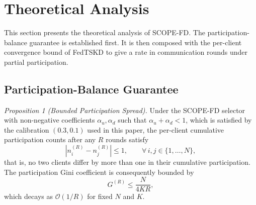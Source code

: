\documentclass[journal]{IEEEtran}
\newcommand{\rev}[1]{#1}
\begin{document}
\section{Theoretical Analysis}
\label{sec:theory}

This section presents the theoretical analysis of SCOPE-FD. The participation-balance guarantee is established first. \rev{It is then composed with the per-client convergence bound of FedTSKD \cite{mu2024fedtskd} to give a rate in communication rounds under partial participation.}

\subsection{Participation-Balance Guarantee}
\label{ssec:participation-balance}

\textit{Proposition 1 (Bounded Participation Spread).} Under the SCOPE-FD selector with non-negative coefficients $\alpha_u, \alpha_d$ such that $\alpha_u + \alpha_d < 1$, which is satisfied by the calibration $(0.3, 0.1)$ used in this paper, the per-client cumulative participation counts after any $R$ rounds satisfy
\begin{equation}
\left| n_i^{(R)} - n_j^{(R)} \right| \le 1, \qquad \forall\, i,j \in \{1,\dots,N\},
\label{eq:spread}
\end{equation}
that is, no two clients differ by more than one in their cumulative participation. The participation Gini coefficient is consequently bounded by
\begin{equation}
G^{(R)} \le \frac{N}{4KR},
\label{eq:gini_bound}
\end{equation}
which decays as $\mathcal{O}(1/R)$ for fixed $N$ and $K$.
\end{document}
